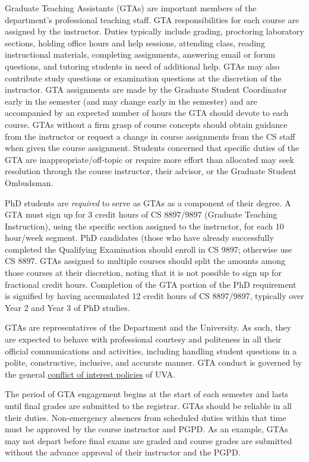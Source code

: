 Graduate Teaching Assistants (GTAs) are important members of the
department's professional teaching staff. GTA responsibilities for each
course are assigned by the instructor. Duties typically include grading,
proctoring laboratory sections, holding office hours and help sessions,
attending class, reading instructional materials, completing
assignments, answering email or forum questions, and tutoring students
in need of additional help. GTAs may also contribute study questions or
examination questions at the discretion of the instructor. GTA
assignments are made by the Graduate Student Coordinator early in the
semester (and may change early in the semester) and are accompanied by
an expected number of hours the GTA should devote to each course. GTAs
without a firm grasp of course concepts should obtain guidance from the
instructor or request a change in course assignments from the CS staff
when given the course assignment. Students concerned that specific
duties of the GTA are inappropriate/off-topic or require more effort
than allocated may seek resolution through the course instructor, their
advisor, or the Graduate Student Ombudsman.

PhD students are \emph{required} to serve as GTAs as a component of
their degree. A GTA must sign up for 3 credit hours of CS 8897/9897
(Graduate Teaching Instruction), using the specific section assigned to
the instructor, for each 10 hour/week segment. PhD candidates (those who
have already successfully completed the Qualifying Examination should
enroll in CS 9897; otherwise use CS 8897. GTAs assigned to multiple
courses should split the amounts among those courses at their
discretion, noting that it is not possible to sign up for fractional
credit hours. Completion of the GTA portion of the PhD requirement is
signified by having accumulated 12 credit hours of CS 8897/9897,
typically over Year 2 and Year 3 of PhD studies.

GTAs are representatives of the Department and the University. As such,
they are expected to behave with professional courtesy and politeness in
all their official communications and activities, including handling
student questions in a polite, constructive, inclusive, and accurate
manner. GTA conduct is governed by the general
\href{https://provost.virginia.edu/academic-policies/conflict-interest-faculty}{conflict
of interest policies} of UVA.

The period of GTA engagement begins at the start of each semester and
lasts until final grades are submitted to the registrar. GTAs
should be reliable in all their duties. Non-emergency absences from
scheduled duties within that time must be approved by the course
instructor and PGPD. As an example, GTAs may not depart before final
exams are graded and course grades are submitted without the advance
approval of their instructor and the PGPD.

